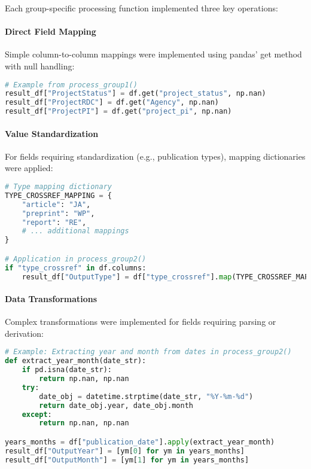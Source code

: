 \documentclass[12pt]{article}
\begin{document}
Each group-specific processing function implemented three key
operations:

\paragraph{Direct Field Mapping}\label{direct-field-mapping}

Simple column-to-column mappings were implemented using pandas' get
method with null handling:

\begin{lstlisting}[language=Python]
# Example from process_group1()
result_df["ProjectStatus"] = df.get("project_status", np.nan)
result_df["ProjectRDC"] = df.get("Agency", np.nan)
result_df["ProjectPI"] = df.get("project_pi", np.nan)
\end{lstlisting}

\paragraph{Value Standardization}\label{value-standardization}

For fields requiring standardization (e.g., publication types), mapping
dictionaries were applied:

\begin{lstlisting}[language=Python]
# Type mapping dictionary
TYPE_CROSSREF_MAPPING = {
    "article": "JA",
    "preprint": "WP",
    "report": "RE",
    # ... additional mappings
}

# Application in process_group2()
if "type_crossref" in df.columns:
    result_df["OutputType"] = df["type_crossref"].map(TYPE_CROSSREF_MAPPING)
\end{lstlisting}

\paragraph{Data Transformations}\label{data-transformations}

Complex transformations were implemented for fields requiring parsing or
derivation:

\begin{lstlisting}[language=Python]
# Example: Extracting year and month from dates in process_group2()
def extract_year_month(date_str):
    if pd.isna(date_str):
        return np.nan, np.nan
    try:
        date_obj = datetime.strptime(date_str, "%Y-%m-%d")
        return date_obj.year, date_obj.month
    except:
        return np.nan, np.nan

years_months = df["publication_date"].apply(extract_year_month)
result_df["OutputYear"] = [ym[0] for ym in years_months]
result_df["OutputMonth"] = [ym[1] for ym in years_months]
\end{lstlisting}
\end{document}
